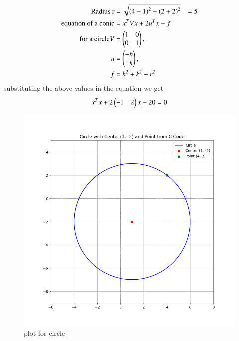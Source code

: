 \documentclass[journal]{IEEEtran}
\begin{document}
\begin{align*}
\text{Radius r} &=\sqrt{\left(4-1\right)^2 + \left(2+2\right)^2}  &= 5\\
 \text{equation of a conic} &= x^TVx + 2u^Tx + f\\
 \text{for a circle} V &= \begin{pmatrix}1&0\\0&1\end{pmatrix},\\ u&=\begin{pmatrix}-h\\-k\end{pmatrix}, \\f &= h^2 + k^2 - r^2\\
\end{align*}
substituting the above values in the equation we get 
\begin{align*}
x^Tx + 2\begin{pmatrix}-1 & 2\end{pmatrix}x - 20 = 0
\end{align*}
\begin{figure}[h!]
\centering
\includegraphics[width=0.7\columnwidth]{figs/Figure_1.png}
\caption{plot for circle}
 \label{fig. 7-7.2-22.1}
\end{figure}
\end{document}
